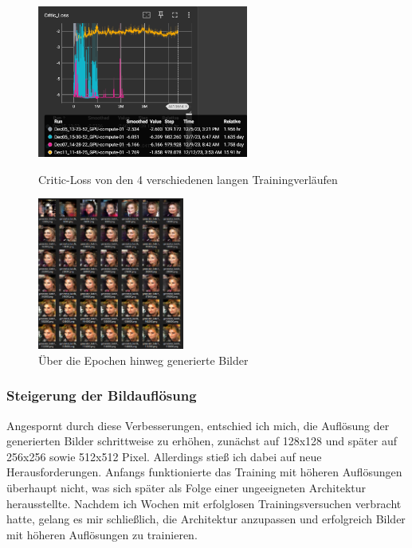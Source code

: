 \documentclass[a4paper, 12pt]{article}
\begin{document}
\begin{figure}[ht]
\centering
\begin{minipage}[t]{0.45\textwidth}
\centering
\includegraphics[height=5cm, keepaspectratio]{./img/alle_modelle.png}
\caption{Critic-Loss von den 4 verschiedenen langen Trainingverläufen}
\label{fig:critic_loss}
\end{minipage}
\hfill %
\begin{minipage}[t]{0.45\textwidth}
\centering
\includegraphics[height=5cm, keepaspectratio]{./img/epochs.png}
\caption{Über die Epochen hinweg generierte Bilder}
\label{fig:epochs}
\end{minipage}
\end{figure}


\subsubsection{Steigerung der Bildauflösung}
Angespornt durch diese Verbesserungen, entschied ich mich, die Auflösung der generierten Bilder schrittweise zu erhöhen, zunächst auf 128x128 und später auf 256x256 sowie 512x512 Pixel. Allerdings stieß ich dabei auf neue Herausforderungen. Anfangs funktionierte das Training mit höheren Auflösungen überhaupt nicht, was sich später als Folge einer ungeeigneten Architektur herausstellte. Nachdem ich Wochen mit erfolglosen Trainingsversuchen verbracht hatte, gelang es mir schließlich, die Architektur anzupassen und erfolgreich Bilder mit höheren Auflösungen zu trainieren.
\end{document}
